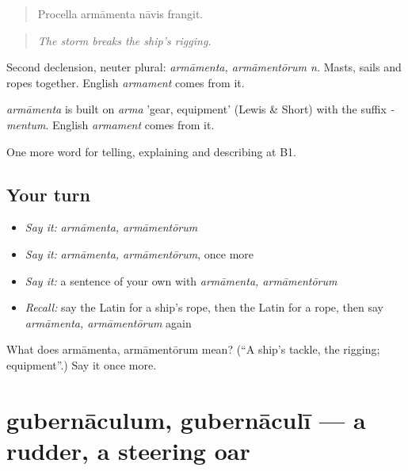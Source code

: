 \begin{quote}
Procella armāmenta nāvis frangit.
\end{quote}

\begin{quote}
\emph{The storm breaks the ship's rigging.}
\end{quote}

Second declension, neuter plural: \emph{armāmenta, armāmentōrum n.} Masts, sails and ropes together. English \emph{armament} comes from it.

\begin{cousinweb}
\emph{armāmenta} is built on \emph{arma} 'gear, equipment' (Lewis \& Short) with the suffix \emph{-mentum}. English \emph{armament} comes from it.
\end{cousinweb}

\begin{grammarlens}[title={What you've built}]
One more word for telling, explaining and describing at B1.
\end{grammarlens}

\subsection*{Your turn}
\begin{itemize}
\raggedright
  \item \emph{Say it:} \emph{armāmenta, armāmentōrum}
  \item \emph{Say it:} \emph{armāmenta, armāmentōrum}, once more
  \item \emph{Say it:} a sentence of your own with \emph{armāmenta, armāmentōrum}
  \item \emph{Recall:} say the Latin for a ship's rope, then the Latin for a rope, then say \emph{armāmenta, armāmentōrum} again
\end{itemize}

\begin{tcolorbox}[breakable,colback=teal!4,colframe=teal!35!black,title={Before you move on}]
What does armāmenta, armāmentōrum mean? (\textquotedblleft{}A ship's tackle, the rigging; equipment\textquotedblright{}.) Say it once more.
\end{tcolorbox}
\section[gubernāculum, gubernāculī]{gubernāculum, gubernāculī — a rudder, a steering oar}

\label{lesson:LA-C437-gubernaculum}



